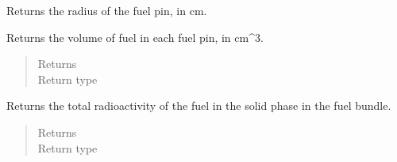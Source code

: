 \documentclass[letterpaper,10pt,openany,oneside,english]{sphinxmanual}
\begin{document}
\begin{fulllineitems}
\begin{fulllineitems}
\end{fulllineitems}


\begin{fulllineitems}
\label{\detokenize{support_rst/fuel_bundle:fuel_bundle.FuelBundle.get_fuel_pin_radius}}
Returns the radius of the fuel pin, in cm.

\end{fulllineitems}


\begin{fulllineitems}
\label{\detokenize{support_rst/fuel_bundle:fuel_bundle.FuelBundle.get_fuel_pin_volume}}
Returns the volume of fuel in each fuel pin, in cm\textasciicircum{}3.
\begin{quote}\begin{description}
\item[{Returns}] \leavevmode
{}

\item[{Return type}] \leavevmode
{}

\end{description}\end{quote}

\end{fulllineitems}


\begin{fulllineitems}
\label{\detokenize{support_rst/fuel_bundle:fuel_bundle.FuelBundle.get_fuel_radioactivity}}
Returns the total radioactivity of the fuel in the solid phase in the
fuel bundle.
\begin{quote}\begin{description}
\item[{Returns}] \leavevmode
{}

\item[{Return type}] \leavevmode
{}


\end{description}
\end{quote}
\end{fulllineitems}
\end{fulllineitems}
\end{document}
